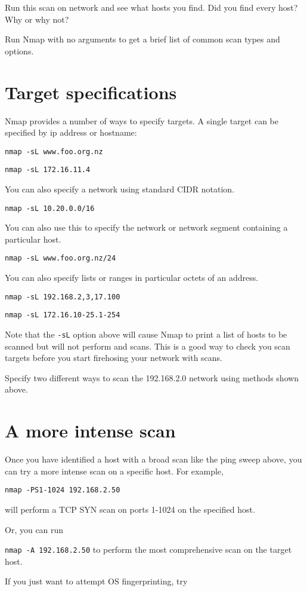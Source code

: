 \documentclass{article}
\begin{document}
Run this scan on network and see what hosts you find.  Did you find every host?  Why or why not?


Run Nmap with no arguments to get a brief list of common scan types and options. 

\section{Target specifications}
Nmap provides a number of ways to specify targets.  A single target can be specified by ip address or hostname:

\texttt{nmap -sL www.foo.org.nz}

\texttt{nmap -sL 172.16.11.4}

You can also specify a network using standard CIDR notation.

\texttt{nmap -sL 10.20.0.0/16}

You can also use this to specify the network or network segment containing a particular host.

\texttt{nmap -sL www.foo.org.nz/24}

You can also specify lists or ranges in particular octets of an address.

\texttt{nmap -sL 192.168.2,3,17.100}

\texttt{nmap -sL 172.16.10-25.1-254}

Note that the \texttt{-sL} option above will cause Nmap to print a list of hosts to be scanned but will not perform and scans. This is a good way to check you scan targets before you start firehosing your network with scans.

Specify two different ways to scan the 192.168.2.0 network using methods shown above.


\section{A more intense scan}
Once you have identified a host with a broad scan like the ping sweep above, you can try a more intense scan on a specific host. For example, 

\texttt{nmap -PS1-1024 192.168.2.50} 

will perform a TCP SYN scan on ports 1-1024 on the specified host.

Or, you can run 

\texttt{nmap -A 192.168.2.50} to perform the most comprehensive scan on the 
target host.

If you just want to attempt OS fingerprinting, try 
\end{document}
